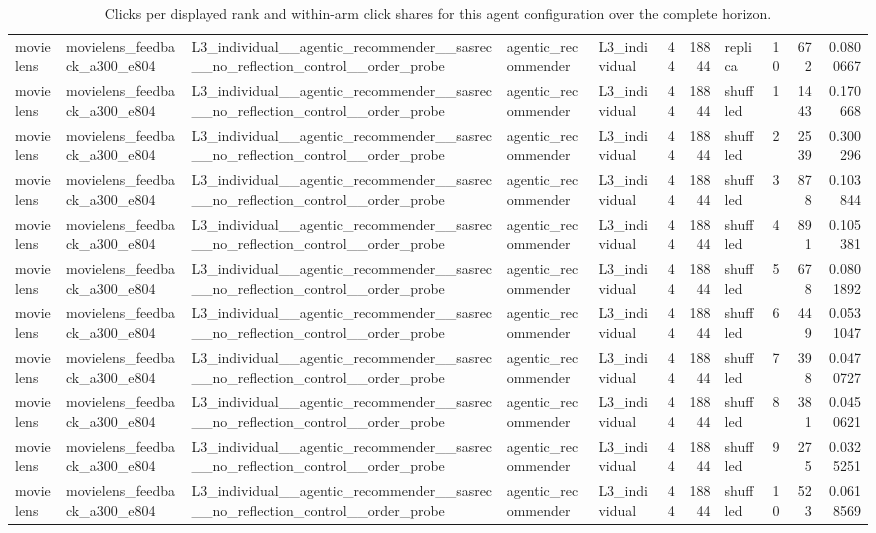 \begin{table}[htbp!]
\begin{tabular}{lllllrrlrrr}
movielens & movielens\_feedback\_a300\_e804 & L3\_individual\_\_agentic\_recommender\_\_sasrec\_\_no\_reflection\_control\_\_order\_probe & agentic\_recommender & L3\_individual & 44 & 18844 & replica & 10 & 672 & 0.0800667 \\
movielens & movielens\_feedback\_a300\_e804 & L3\_individual\_\_agentic\_recommender\_\_sasrec\_\_no\_reflection\_control\_\_order\_probe & agentic\_recommender & L3\_individual & 44 & 18844 & shuffled & 1 & 1443 & 0.170668 \\
movielens & movielens\_feedback\_a300\_e804 & L3\_individual\_\_agentic\_recommender\_\_sasrec\_\_no\_reflection\_control\_\_order\_probe & agentic\_recommender & L3\_individual & 44 & 18844 & shuffled & 2 & 2539 & 0.300296 \\
movielens & movielens\_feedback\_a300\_e804 & L3\_individual\_\_agentic\_recommender\_\_sasrec\_\_no\_reflection\_control\_\_order\_probe & agentic\_recommender & L3\_individual & 44 & 18844 & shuffled & 3 & 878 & 0.103844 \\
movielens & movielens\_feedback\_a300\_e804 & L3\_individual\_\_agentic\_recommender\_\_sasrec\_\_no\_reflection\_control\_\_order\_probe & agentic\_recommender & L3\_individual & 44 & 18844 & shuffled & 4 & 891 & 0.105381 \\
movielens & movielens\_feedback\_a300\_e804 & L3\_individual\_\_agentic\_recommender\_\_sasrec\_\_no\_reflection\_control\_\_order\_probe & agentic\_recommender & L3\_individual & 44 & 18844 & shuffled & 5 & 678 & 0.0801892 \\
movielens & movielens\_feedback\_a300\_e804 & L3\_individual\_\_agentic\_recommender\_\_sasrec\_\_no\_reflection\_control\_\_order\_probe & agentic\_recommender & L3\_individual & 44 & 18844 & shuffled & 6 & 449 & 0.0531047 \\
movielens & movielens\_feedback\_a300\_e804 & L3\_individual\_\_agentic\_recommender\_\_sasrec\_\_no\_reflection\_control\_\_order\_probe & agentic\_recommender & L3\_individual & 44 & 18844 & shuffled & 7 & 398 & 0.0470727 \\
movielens & movielens\_feedback\_a300\_e804 & L3\_individual\_\_agentic\_recommender\_\_sasrec\_\_no\_reflection\_control\_\_order\_probe & agentic\_recommender & L3\_individual & 44 & 18844 & shuffled & 8 & 381 & 0.0450621 \\
movielens & movielens\_feedback\_a300\_e804 & L3\_individual\_\_agentic\_recommender\_\_sasrec\_\_no\_reflection\_control\_\_order\_probe & agentic\_recommender & L3\_individual & 44 & 18844 & shuffled & 9 & 275 & 0.0325251 \\
movielens & movielens\_feedback\_a300\_e804 & L3\_individual\_\_agentic\_recommender\_\_sasrec\_\_no\_reflection\_control\_\_order\_probe & agentic\_recommender & L3\_individual & 44 & 18844 & shuffled & 10 & 523 & 0.0618569 \\
\hline
\end{tabular}
\caption{Clicks per displayed rank and within-arm click shares for this agent configuration over the complete horizon.}
\label{chap:results:tab:rq3_rank_counts_l3_individual_agentic_recommender_sasrec_no_reflection_control_order_probe}
\end{table}
